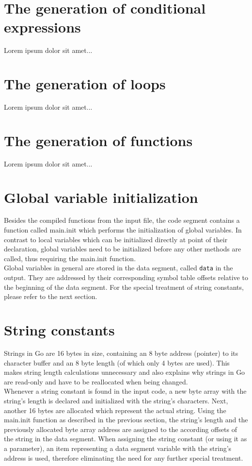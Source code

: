 \documentclass[a4paper]{scrreprt}
\begin{document}
    \section{The generation of conditional expressions}
      Lorem ipsum dolor sit amet...

    \section{The generation of loops}
      Lorem ipsum dolor sit amet...

    \section{The generation of functions} \label{The generation of functions}
      Lorem ipsum dolor sit amet...

    \section{Global variable initialization}
        Besides the compiled functions from the input file, the code segment contains a function called main.init which performs the initialization of global variables. In contrast to local variables which can be initialized directly at point of their declaration, global variables need to be initialized before any other methods are called, thus requiring the main.init function.\\
        Global variables in general are stored in the data segment, called \texttt{data} in the output. They are addressed by their corresponding symbol table offsets relative to the beginning of the data segment. For the special treatment of string constants, please refer to the next section.

    \section{String constants} \label{String constants}
        Strings in Go are 16 bytes in size, containing an 8 byte address (pointer) to its character buffer and an 8 byte length (of which only 4 bytes are used). This makes string length calculations unnecessary and also explains why strings in Go are read-only and have to be reallocated when being changed.\\
        Whenever a string constant is found in the input code, a new byte array with the string's length is declared and initialized with the string's characters. Next, another 16 bytes are allocated which represent the actual string. Using the main.init function as described in the previous section, the string's length and the previously allocated byte array address are assigned to the according offsets of the string in the data segment. When assigning the string constant (or using it as a parameter), an item representing a data segment variable with the string's address is used, therefore eliminating the need for any further special treatment.
\end{document}
